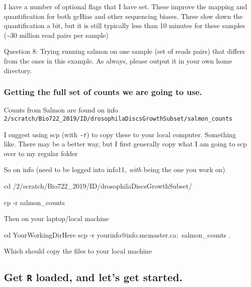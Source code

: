 \documentclass[
]{article}
\newenvironment{Shaded}{\begin{snugshade}}{\end{snugshade}}
\newcommand{\BuiltInTok}[1]{#1}
\newcommand{\FunctionTok}[1]{\textcolor[rgb]{0.00,0.00,0.00}{#1}}
\newcommand{\NormalTok}[1]{#1}
\begin{document}
I have a number of optional flags that I have set. These improve the
mapping and quantification for both gcBias and other sequencing biases.
These slow down the quantification a bit, but it is still typically less
than 10 minutes for these samples (\textasciitilde30 million read pairs
per sample)

Question 8: Trying running salmon on one sample (set of reads pairs)
that differs from the ones in this example. As always, please output it
in your own home directory.

\hypertarget{getting-the-full-set-of-counts-we-are-going-to-use.}{%
\subsubsection{Getting the full set of counts we are going to
use.}\label{getting-the-full-set-of-counts-we-are-going-to-use.}}

Counts from Salmon are found on info
\texttt{2/scratch/Bio722\_2019/ID/drosophilaDiscsGrowthSubset/salmon\_counts}

I suggest using scp (with \texttt{-r}) to copy these to your local
computer. Something like. There may be a better way, but I first
generally copy what I am going to scp over to my regular folder

So on info (need to be logged into info11\emph{, with } being the one
you work on)

\begin{Shaded}
\begin{Highlighting}[]
\BuiltInTok{cd}\NormalTok{ /2/scratch/Bio722_2019/ID/drosophilaDiscsGrowthSubset/}

\FunctionTok{cp}\NormalTok{ -r salmon_counts ~}
\end{Highlighting}
\end{Shaded}

Then on your laptop/local machine

\begin{Shaded}
\begin{Highlighting}[]
\BuiltInTok{cd}\NormalTok{ YourWorkingDirHere}
\FunctionTok{scp}\NormalTok{ -r yourinfo@info.mcmaster.ca:~salmon_counts .}
\end{Highlighting}
\end{Shaded}

Which should copy the files to your local machine

\hypertarget{get-r-loaded-and-lets-get-started.}{%
\subsection{\texorpdfstring{Get \texttt{R} loaded, and let's get
started.}{Get R loaded, and let's get started.}}\label{get-r-loaded-and-lets-get-started.}}
\end{document}
